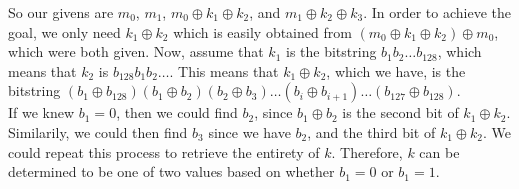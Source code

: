 \documentclass[12pt]{article}
\begin{document}
\begin{list}{.}{}
\begin{list}{()}{}
So our givens are $m_0$, $m_1$, $m_0 \oplus k_1 \oplus k_2$, and $m_1 \oplus k_2
\oplus k_3$.  In order to achieve the goal, we only need $k_1 \oplus k_2$ which
is easily obtained from $(m_0 \oplus k_1 \oplus k_2) \oplus m_0$, which were
both given.  Now, assume that $k_1$ is the bitstring $b_1 b_2 \dots b_{128}$,
which means that $k_2$ is $b_{128} b_1 b_2 \dots$.  This means that $k_1 \oplus
k_2$, which we have, is the bitstring $(b_1 \oplus b_{128})(b_1 \oplus b_2)(b_2
\oplus b_3)\dots(b_i \oplus b_{i+1})\dots(b_{127}\oplus b_{128})$.\\
If we knew $b_1 = 0$, then we could find $b_2$, since $b_1 \oplus b_2$ is
the second bit of $k_1 \oplus k_2$.  Similarily, we could then find $b_3$ since
we have $b_2$, and the third bit of $k_1 \oplus k_2$.  We could repeat this
process to retrieve the entirety of $k$.  Therefore, $k$ can be determined to be
one of two values based on whether $b_1 = 0$ or $b_1 = 1$.

\end{list}

\end{list}
\end{document}
